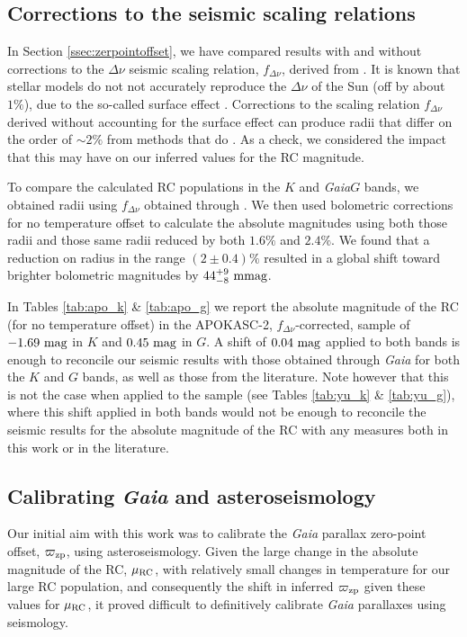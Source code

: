 \documentclass[fleqn,usenatbib]{mnras}
\newcommand{\oozp}{\mbox{$\varpi_{\rm zp}$}\xspace}
\newcommand{\muas}{\mbox{$\mu \rm as$}\xspace}
\newcommand{\murc}{\mbox{$\mu_{\rm RC}$}\xspace}
\newcommand{\fdnu}{\mbox{$f_{\Delta\nu}$}\xspace}
\newcommand{\dnu}{\mbox{$\Delta \nu$}\xspace}
\newcommand{\gaia}{\emph{Gaia}\xspace}
\begin{document}

\subsection{Corrections to the seismic scaling relations}\label{ssec:scalingrelations}

In Section \ref{ssec:zerpointoffset}, we have compared results with and without corrections to the \dnu seismic scaling relation, \fdnu, derived from \cite{art:sharma+stello2016}. It is known that stellar models do not not accurately reproduce the \dnu of the Sun (off by about $1\%$), due to the so-called surface effect \citep{art:christensen-dalsgaard+1988, art:white+2011}. Corrections to the scaling relation \fdnu derived without accounting for the surface effect \citep[such as ][]{art:sharma+stello2016} can produce radii that differ on the order of $\sim 2\%$ from methods that do \citep[such as][]{art:rodrigues+2017}. As a check, we considered the impact that this may have on our inferred values for the RC magnitude.

To compare the calculated RC populations in the $K$ and \gaia $G$ bands, we obtained radii using \fdnu obtained through \cite{art:sharma+stello2016}. We then used bolometric corrections for no temperature offset to calculate the absolute magnitudes using both those radii and those same radii reduced by both $1.6\%$ and $2.4\%$. We found that a reduction on radius in the range $(2 \pm 0.4)\%$ resulted in a global shift toward brighter bolometric magnitudes by $44^{+9}_{-8}\ \rm mmag$.

In Tables \ref{tab:apo_k} \& \ref{tab:apo_g} we report the absolute magnitude of the RC (for no temperature offset) in the APOKASC-2, \fdnu-corrected, sample of $-1.69\ \rm mag$ in $K$ and $0.45\ \rm mag$ in $G$. A shift of $0.04\ \rm mag$ applied to both bands is enough to reconcile our seismic results with those obtained through \gaia for both the $K$ and $G$ bands, as well as those from the literature. Note however that this is not the case when applied to the  sample (see Tables \ref{tab:yu_k} \& \ref{tab:yu_g}), where this shift applied in both bands would not be enough to reconcile the seismic results for the absolute magnitude of the RC with any measures both in this work or in the literature.

\subsection{Calibrating \gaia and asteroseismology}
Our initial aim with this work was to calibrate the \gaia parallax zero-point offset, \oozp, using asteroseismology. Given the large change in the absolute magnitude of the RC, \murc, with relatively small changes in temperature for our large RC population, and consequently the shift in inferred \oozp given these values for \murc, it proved difficult to definitively calibrate \gaia parallaxes using seismology.
\end{document}
